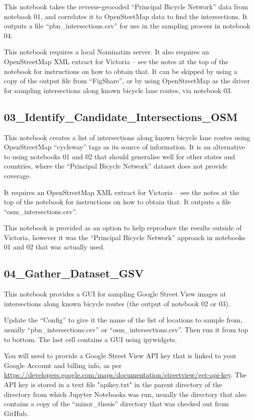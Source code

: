 \documentclass[11pt,twoside]{report}
\begin{document}
This notebook takes the reverse-geocoded ``Principal Bicycle Network'' data from notebook 01, and correlates it to OpenSteetMap data to find the intersections.  It outputs a file ``pbn\_intersections.csv'' for use in the sampling process in notebook 04.

This notebook requires a local Nominatim server.  It also requires an OpenStreetMap XML extract for Victoria -- see the notes at the top of the notebook for instructions on how to obtain that.  It can be skipped by using a copy of the output file from ``FigShare'', or by using OpenStreetMap as the driver for sampling intersections along known bicycle lane routes, via notebook 03.


\subsection{03\_Identify\_Candidate\_Intersections\_OSM}
\label{aj03}

This notebook creates a list of intersections along known bicycle lane routes using OpenStreetMap ``cycleway'' tags as its source of information.  It is an alternative to using notebooks 01 and 02 that should generalise well for other states and countries, where the ``Principal Bicycle Network'' dataset does not provide coverage.

It requires an OpenStreetMap XML extract for Victoria -- see the notes at the top of the notebook for instructions on how to obtain that.   It outputs a file ``osm\_intersections.csv''.

This notebook is provided as an option to help reproduce the results outside of Victoria, however it was the ``Principal Bicycle Network'' approach in notebooks 01 and 02 that was actually used.

\subsection{04\_Gather\_Dataset\_GSV}
\label{aj04}

This notebook provides a GUI for sampling Google Street View images at intersections along known bicycle routes (the output of notebook 02 or 03).

Update the ``Config'' to give it the name of the list of locations to sample from, usually ``pbn\_intersections.csv'' or ``osm\_intersections.csv''.  Then run it from top to bottom.  The last cell contains a GUI using ipywidgets.

You will need to provide a Google Street View API key that is linked to your Google Account and billing info, as per \url{https://developers.google.com/maps/documentation/streetview/get-api-key}.  The API key is stored in a text file "apikey.txt" in the parent directory of the directory from which Jupyter Notebooks was run, usually the directory that also contains a copy of the ``minor\_thesis'' directory that was checked out from GitHub.
\end{document}
